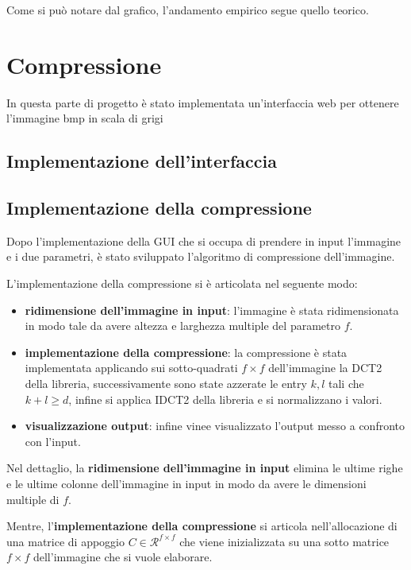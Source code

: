 Come si può notare dal grafico, l'andamento empirico segue quello teorico.

\section{Compressione}
In questa parte di progetto è stato implementata un'interfaccia web per ottenere
l'immagine bmp in scala di grigi

\subsection{Implementazione dell'interfaccia}

\subsection{Implementazione della compressione}
Dopo l'implementazione della GUI che si occupa di prendere in input l'immagine e
i due parametri, è stato sviluppato l'algoritmo di compressione dell'immagine.

L'implementazione della compressione si è articolata nel seguente modo:
\begin{itemize}
    \item \textbf{ridimensione dell'immagine in input}: l'immagine è stata ridimensionata
          in modo tale da avere altezza e larghezza multiple del parametro $f$.
    \item \textbf{implementazione della compressione}: la compressione è stata implementata
          applicando sui sotto-quadrati $f\times f$ dell'immagine la DCT2 della libreria,
          successivamente sono state azzerate le entry $k,l$ tali che $k+l\ge d$, infine
          si applica IDCT2 della libreria e si normalizzano i valori.
    \item \textbf{visualizzazione output}: infine vinee visualizzato l'output
          messo a confronto con l'input.
\end{itemize}

Nel dettaglio, la \textbf{ridimensione dell'immagine in input} elimina le ultime
righe e le ultime colonne dell'immagine in input in modo da avere le dimensioni
multiple di $f$.

Mentre, l'\textbf{implementazione della compressione} si articola nell'allocazione
di una matrice di appoggio $C\in \mathcal{R}^{f\times f}$ che viene inizializzata
su una sotto matrice $f\times f$ dell'immagine che si vuole elaborare.